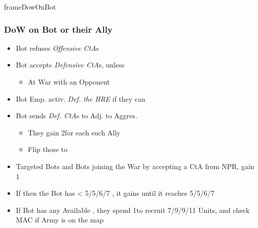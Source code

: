 \documentclass[10pt]{article}
\begin{document}
\begin{dynamiccontents*}{frameDowOnBot}
	{\botrules
	\begin{multicols}{2}
		\subsubsection*{DoW on Bot or their Ally }
		\begin{itemize}
			\item Bot refuses \emph{Offensive CtA}s
			\item Bot accepts \emph{Defensive CtA}s, unless
			\begin{itemize}
				\item At War with an Opponent
			\end{itemize}
			\item Bot Emp. activ. \emph{Def. the HRE} if they can
			\item Bot sends \emph{Def. CtA}s to \allies Adj. to Aggres.
			\begin{itemize}
				\item They gain 2\botpower for each such Ally
				\item Flip those \alliances to \activeallies
			\end{itemize}
		\end{itemize}
		\columnbreak
		\begin{itemize}
			\item Targeted Bots and Bots joining the War by accepting a CtA from NPR, gain 1\botpower
			\item If then the Bot has < 5/5/6/7 \botpower, it gains \botpower until it reaches 5/5/6/7
			\item If Bot has any Available \manpower, they spend 1\botpower to recruit 7/9/9/11 Units, and check MAC if Army is on the map
		\end{itemize}
	\end{multicols}
  }
\end{dynamiccontents*}
\end{document}
